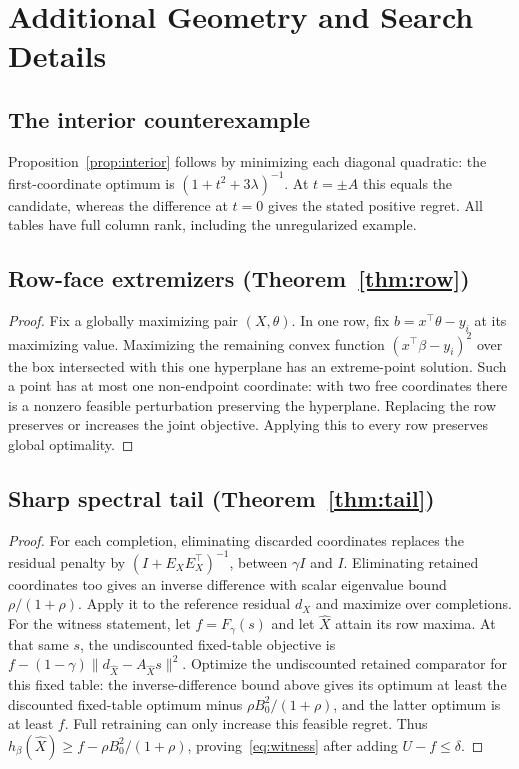 \section{Additional Geometry and Search Details}\label{app:method-details}

\subsection{The interior counterexample}
Proposition~\ref{prop:interior} follows by minimizing each diagonal quadratic: the first-coordinate optimum is $(1+t^2+3\lambda)^{-1}$. At $t=\pm A$ this equals the candidate, whereas the difference at $t=0$ gives the stated positive regret. All tables have full column rank, including the unregularized example.

\subsection{Row-face extremizers (Theorem~\ref{thm:row})}
\begin{proof}
Fix a globally maximizing pair $(X,\theta)$. In one row, fix $b=x^\top\theta-y_i$ at its maximizing value. Maximizing the remaining convex function $(x^\top\beta-y_i)^2$ over the box intersected with this one hyperplane has an extreme-point solution. Such a point has at most one non-endpoint coordinate: with two free coordinates there is a nonzero feasible perturbation preserving the hyperplane. Replacing the row preserves or increases the joint objective. Applying this to every row preserves global optimality.
\end{proof}

\subsection{Sharp spectral tail (Theorem~\ref{thm:tail})}
\begin{proof}
For each completion, eliminating discarded coordinates replaces the residual penalty by $(I+E_XE_X^\top)^{-1}$, between $\gamma I$ and $I$. Eliminating retained coordinates too gives an inverse difference with scalar eigenvalue bound $\rho/(1+\rho)$. Apply it to the reference residual $d_X$ and maximize over completions. For the witness statement, let $f=F_\gamma(s)$ and let $\widehat X$ attain its row maxima. At that same $s$, the undiscounted fixed-table objective is $f-(1-\gamma)\|d_{\widehat X}-A_{\widehat X}s\|^2$. Optimize the undiscounted retained comparator for this fixed table: the inverse-difference bound above gives its optimum at least the discounted fixed-table optimum minus $\rho B_0^2/(1+\rho)$, and the latter optimum is at least $f$. Full retraining can only increase this feasible regret. Thus $h_\beta(\widehat X)\geq f-\rho B_0^2/(1+\rho)$, proving~\eqref{eq:witness} after adding $U-f\leq\delta$.
\end{proof}

